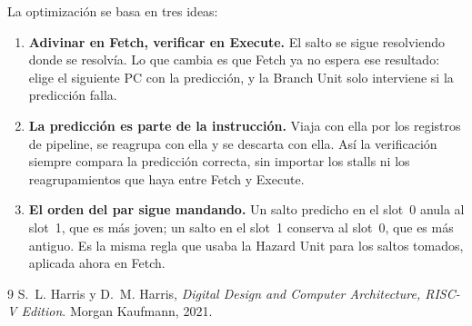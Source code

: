 \documentclass[11pt,a4paper]{article}
\begin{document}
La optimización se basa en tres ideas:
\begin{enumerate}
  \item \textbf{Adivinar en Fetch, verificar en Execute.} El salto se sigue resolviendo
        donde se resolvía. Lo que cambia es que Fetch ya no espera ese resultado: elige el
        siguiente PC con la predicción, y la Branch Unit solo interviene si la predicción
        falla.
  \item \textbf{La predicción es parte de la instrucción.} Viaja con ella por los
        registros de pipeline, se reagrupa con ella y se descarta con ella. Así la
        verificación siempre compara la predicción correcta, sin importar los stalls ni
        los reagrupamientos que haya entre Fetch y Execute.
  \item \textbf{El orden del par sigue mandando.} Un salto predicho en el slot~0 anula al
        slot~1, que es más joven; un salto en el slot~1 conserva al slot~0, que es más
        antiguo. Es la misma regla que usaba la Hazard Unit para los saltos tomados,
        aplicada ahora en Fetch.
\end{enumerate}

\begin{thebibliography}{9}
 S.~L. Harris y D.~M. Harris, \emph{Digital Design and Computer
  Architecture, RISC-V Edition}. Morgan Kaufmann, 2021.
\end{thebibliography}
\end{document}
